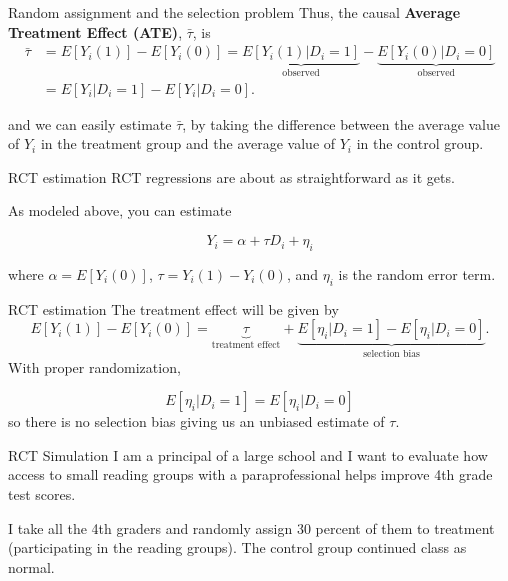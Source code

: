 \documentclass[
  ignorenonframetext,
]{beamer}
\begin{document}
\begin{frame}{Random assignment and the selection problem}
\protect\hypertarget{random-assignment-and-the-selection-problem-6}{}
Thus, the causal \textbf{Average Treatment Effect (ATE)},
\(\bar{\tau}\), is\\
\footnotesize \[
\begin{aligned}
\bar{\tau}&=E[Y_i(1)]-E[Y_i(0)]=\underbrace{E[Y_i(1)|D_i=1]}_\text{observed}-\underbrace{E[Y_i(0)|D_i=0]}_\text{observed}\\
&=E[Y_i|D_i=1]-E[Y_i|D_i=0].
\end{aligned}
\] \normalsize

and we can easily estimate \(\bar{\tau}\), by taking the difference
between the average value of \(Y_i\) in the treatment group and the
average value of \(Y_i\) in the control group.
\end{frame}

\begin{frame}{RCT estimation}
\protect\hypertarget{rct-estimation}{}
RCT regressions are about as straightforward as it gets.

As modeled above, you can estimate

\[
Y_i=\alpha+\tau D_i+\eta_i
\]

where \(\alpha=E[Y_i(0)]\), \(\tau=Y_i(1)-Y_i(0)\), and \(\eta_i\) is
the random error term.
\end{frame}

\begin{frame}{RCT estimation}
\protect\hypertarget{rct-estimation-1}{}
The treatment effect will be given by \[
E[Y_i(1)]-E[Y_i(0)] = 
    \underbrace{\tau}_\text{treatment effect} + \underbrace{E[\eta_i|D_i=1]-E[\eta_i|D_i=0]}_\text{selection bias}.
\] With proper randomization,

\[
E[\eta_i|D_i=1]= E[\eta_i|D_i=0]
\] so there is no selection bias giving us an unbiased estimate of
\(\tau\).
\end{frame}

\begin{frame}{RCT Simulation}
\protect\hypertarget{rct-simulation}{}
I am a principal of a large school and I want to evaluate how access to
small reading groups with a paraprofessional helps improve 4th grade
test scores.

I take all the 4th graders and randomly assign 30 percent of them to
treatment (participating in the reading groups). The control group
continued class as normal.
\end{frame}
\end{document}
